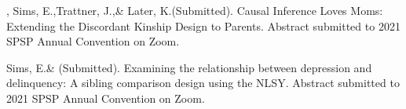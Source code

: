 \item \meb, Sims, E.,\notb Trattner, J.,\nota \& Later, K.\notans (Submitted). Causal Inference Loves Moms: Extending the Discordant Kinship Design to Parents. Abstract submitted to 2021 SPSP Annual Convention on Zoom.
%
\item Sims, E.\notbns \& \meb (Submitted). Examining the relationship between depression and delinquency: A sibling comparison design using the NLSY. Abstract submitted to 2021 SPSP Annual Convention on Zoom.
